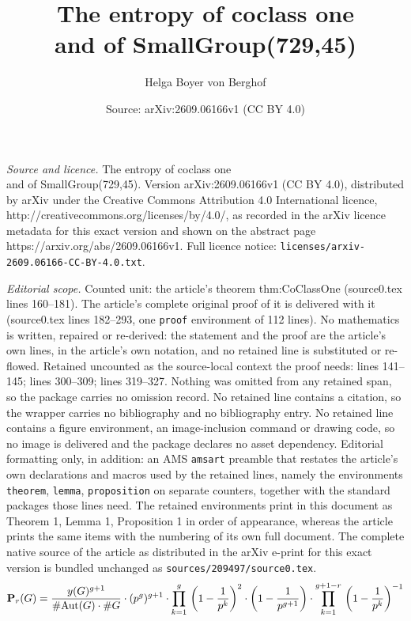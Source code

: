\documentclass[10pt,a4paper]{amsart}
\title{The entropy of coclass one \\ and of SmallGroup(729,45)}
\author{Helga Boyer von Berghof}
\date{Source: arXiv:2609.06166v1 (CC BY 4.0)}
\begin{document}
\maketitle

\noindent\emph{Source and licence.} The entropy of coclass one \\ and of SmallGroup(729,45). Version arXiv:2609.06166v1 (CC BY 4.0), distributed by arXiv under the Creative Commons Attribution 4.0 International licence, http://creativecommons.org/licenses/by/4.0/, as recorded in the arXiv licence metadata for this exact version and shown on the abstract page https://arxiv.org/abs/2609.06166v1. Full licence notice: \texttt{licenses/arxiv-2609.06166-CC-BY-4.0.txt}.\par\smallskip

\noindent\textit{Editorial scope.} Counted unit: the article's theorem thm:CoClassOne (source0.tex lines 160--181). The article's complete original proof of it is delivered with it (source0.tex lines 182--293, one \texttt{proof} environment of 112 lines). No mathematics is written, repaired or re-derived: the statement and the proof are the article's own lines, in the article's own notation, and no retained line is substituted or re-flowed.  Retained uncounted as the source-local context the proof needs: lines 141--145; lines 300--309; lines 319--327.  Nothing was omitted from any retained span, so the package carries no omission record.  No retained line contains a citation, so the wrapper carries no bibliography and no bibliography entry.  No retained line contains a figure environment, an image-inclusion command or drawing code, so no image is delivered and the package declares no asset dependency.  Editorial formatting only, in addition: an AMS \texttt{amsart} preamble that restates the article's own declarations and macros used by the retained lines, namely the environments \texttt{theorem}, \texttt{lemma}, \texttt{proposition} on separate counters, together with the standard packages those lines need.  The retained environments print in this document as Theorem 1, Lemma 1, Proposition 1 in order of appearance, whereas the article prints the same items with the numbering of its own full document.  The complete native source of the article as distributed in the arXiv e-print for this exact version is bundled unchanged as \texttt{sources/209497/source0.tex}.
\begin{equation}
\label{eqn:RealMeasure}
{\bf P}_r(G)=\frac{y(G)^{g+1}}{\#\mathrm{Aut}(G)\cdot\#G}\cdot(p^g)^{g+1}\cdot\prod_{k=1}^{g}\,\left(1-\frac{1}{p^k}\right)^2
\cdot\left(1-\frac{1}{p^{g+1}}\right)\cdot\prod_{k=1}^{g+1-r}\,\left(1-\frac{1}{p^k}\right)^{-1}
\end{equation}
\end{document}
